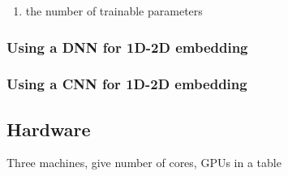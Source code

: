 \begin{enumerate}
 \item the number of trainable parameters
\end{enumerate}

\subsubsection{Using a DNN for 1D-2D embedding} \label{sec:methods:dnn-embedding}
\subsubsection{Using a CNN for 1D-2D embedding} \label{sec:methods:cnn-embedding}

\subsection{Hardware}
\xxx Three machines, give number of cores, GPUs in a table \xxx






